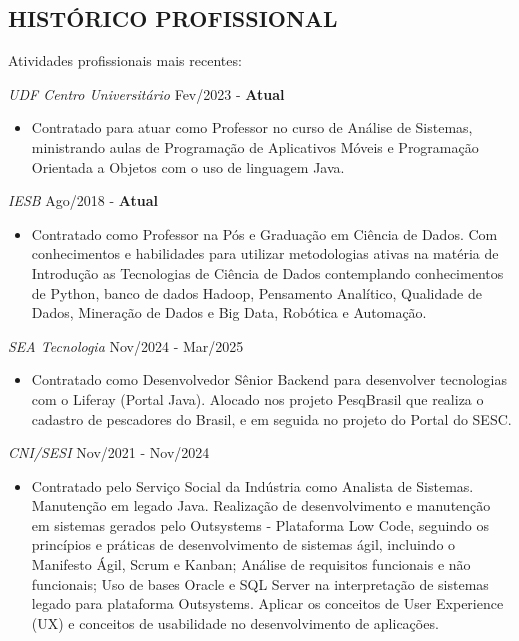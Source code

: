 \documentclass{res}
\begin{document}
\begin{resume}
		\section{HISTÓRICO PROFISSIONAL} %
		\vspace{8pt}
		Atividades profissionais mais recentes:
		
		{\sl UDF Centro Universitário} \hfill Fev/2023 - \textbf{Atual}
		\begin{itemize}
			\item Contratado para atuar como Professor no curso de Análise de Sistemas, ministrando aulas de Programação de Aplicativos Móveis e Programação Orientada a Objetos com o uso de linguagem Java.
		\end{itemize}		
		{\sl IESB} \hfill Ago/2018 - \textbf{Atual}
		\begin{itemize}
			\item Contratado como Professor na Pós e Graduação em Ciência de Dados. Com conhecimentos e habilidades para utilizar metodologias ativas na matéria de Introdução as Tecnologias de Ciência de Dados contemplando conhecimentos de Python, banco de dados Hadoop, Pensamento Analítico, Qualidade de Dados, Mineração de Dados e Big Data, Robótica e Automação.
		\end{itemize}

		{\sl SEA Tecnologia} \hfill Nov/2024 - Mar/2025
		\begin{itemize}
			\item Contratado como Desenvolvedor Sênior Backend para desenvolver tecnologias com o Liferay (Portal Java). Alocado nos projeto PesqBrasil que realiza o cadastro de pescadores do Brasil, e em seguida no projeto do Portal do SESC.
		\end{itemize}
		
		{\sl CNI/SESI} \hfill Nov/2021 - Nov/2024
		\begin{itemize}
			\item Contratado pelo Serviço Social da Indústria como Analista de Sistemas. Manutenção em legado Java. Realização de desenvolvimento e manutenção em sistemas gerados pelo Outsystems - Plataforma Low Code, seguindo os princípios e práticas de desenvolvimento de sistemas ágil, incluindo o Manifesto Ágil, Scrum e Kanban; Análise de requisitos funcionais e não funcionais; Uso de bases Oracle e SQL Server na interpretação de sistemas legado para plataforma Outsystems. Aplicar os conceitos de User Experience (UX) e conceitos de usabilidade no desenvolvimento de aplicações.
		\end{itemize}


\end{resume}
\end{document}
